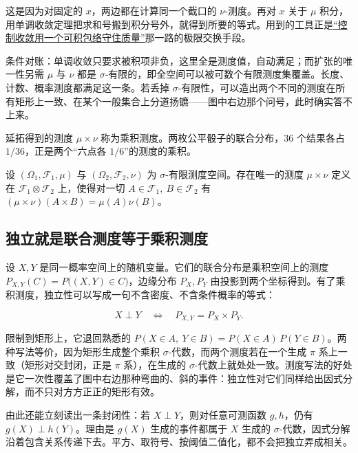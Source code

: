 这是因为对固定的 \(x\)，两边都在计算同一个截口的 \(\nu\)-测度。再对 \(x\) 关于 \(\mu\) 积分，用单调收敛定理把求和号搬到积分号外，就得到所要的等式。用到的工具正是\hyperref[sec:12-Real-Analysis-Support/04-Limits-and-Integration/02]{``控制收敛用一个可积包络守住质量''}那一路的极限交换手段。

条件对账：单调收敛只要求被积项非负，这里全是测度值，自动满足；而扩张的唯一性另需 \(\mu\) 与 \(\nu\) 都是 \(\sigma\)-有限的，即全空间可以被可数个有限测度集覆盖。长度、计数、概率测度都满足这一条。若丢掉 \(\sigma\)-有限性，可以造出两个不同的测度在所有矩形上一致、在某个一般集合上分道扬镳——图中右边那个问号，此时确实答不上来。

延拓得到的测度 \(\mu\times\nu\) 称为乘积测度。两枚公平骰子的联合分布，36 个结果各占 \(1/36\)，正是两个``六点各 \(1/6\)''的测度的乘积。

\begin{definition}[乘积测度]
设 \((\Omega_1,\mathcal F_1,\mu)\) 与 \((\Omega_2,\mathcal F_2,\nu)\) 为 \(\sigma\)-有限测度空间。存在唯一的测度 \(\mu\times\nu\) 定义在 \(\mathcal F_1\otimes\mathcal F_2\) 上，使得对一切 \(A\in\mathcal F_1,\ B\in\mathcal F_2\) 有 \((\mu\times\nu)(A\times B)=\mu(A)\nu(B)\)。
\end{definition}

\subsection{独立就是联合测度等于乘积测度}

设 \(X,Y\) 是同一概率空间上的随机变量。它们的联合分布是乘积空间上的测度 \(P_{X,Y}(C)=P\bigl((X,Y)\in C\bigr)\)，边缘分布 \(P_X,P_Y\) 由投影到两个坐标得到。有了乘积测度，独立性可以写成一句不含密度、不含条件概率的等式：

\[
X\perp Y
\quad\Longleftrightarrow\quad
P_{X,Y}=P_X\times P_Y .
\]

限制到矩形上，它退回熟悉的 \(P(X\in A,\ Y\in B)=P(X\in A)\,P(Y\in B)\)。两种写法等价，因为矩形生成整个乘积 \(\sigma\)-代数，而两个测度若在一个生成 \(\pi\) 系上一致（矩形对交封闭，正是 \(\pi\) 系），在生成的 \(\sigma\)-代数上就处处一致。测度写法的好处是它一次性覆盖了图中右边那种弯曲的、斜的事件：独立性对它们同样给出因式分解，而不只对方方正正的矩形有效。

由此还能立刻读出一条封闭性：若 \(X\perp Y\)，则对任意可测函数 \(g,h\)，仍有 \(g(X)\perp h(Y)\)。理由是 \(g(X)\) 生成的事件都属于 \(X\) 生成的 \(\sigma\)-代数，因式分解沿着包含关系传递下去。平方、取符号、按阈值二值化，都不会把独立弄成相关。

